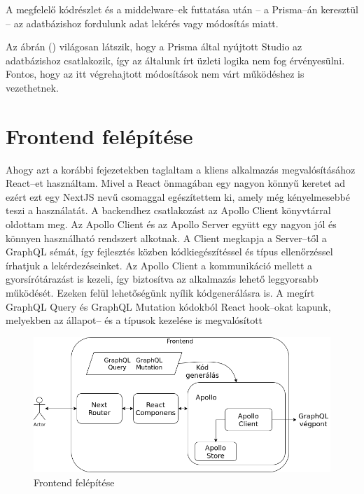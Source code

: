 A megfelelő kódrészlet és a middelware–ek futtatása után – a Prisma–án keresztül – az adatbázishoz fordulunk adat lekérés vagy módosítás miatt.

Az ábrán () világosan látszik, hogy a Prisma által nyújtott Studio az adatbázishoz csatlakozik, így az általunk írt üzleti logika nem fog érvényesülni.
Fontos, hogy az itt végrehajtott módosítások nem várt működéshez is vezethetnek.


\section{Frontend felépítése}

Ahogy azt a korábbi fejezetekben taglaltam a kliens alkalmazás megvalósításához React–et használtam. Mivel a React önmagában egy nagyon könnyű keretet ad ezért ezt egy NextJS nevű csomaggal egészítettem ki, amely még kényelmesebbé teszi a használatát.
A backendhez csatlakozást az Apollo Client könyvtárral oldottam meg. 
Az Apollo Client és az Apollo Server együtt egy nagyon jól és könnyen használható rendszert alkotnak.
A Client megkapja a Server–től a GraphQL sémát, így fejlesztés közben kódkiegészítéssel és típus ellenőrzéssel írhatjuk a lekérdezéseinket.
Az Apollo Client a kommunikáció mellett a gyorsírótárazást is kezeli, így biztosítva az alkalmazás lehető leggyorsabb működését.
Ezeken felül lehetőségünk nyílik kódgenerálásra is.
A megírt GraphQL Query és GraphQL Mutation kódokból React hook–okat kapunk, melyekben az állapot– és a típusok kezelése is megvalósított

\begin{figure}[!ht]
  \centering
  \includegraphics[width=150mm, keepaspectratio]{figures/frontend.png}
  \caption{Frontend felépítése}
  \label{fig:frontend}
\end{figure}

